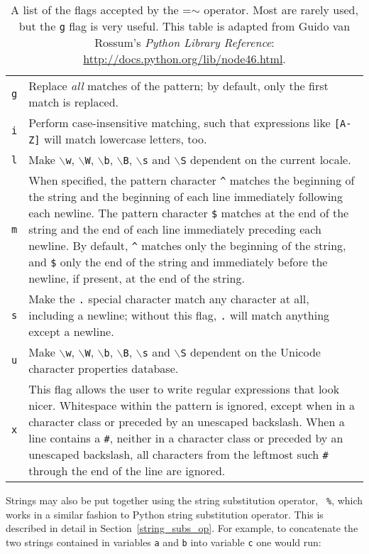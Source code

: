 \begin{table}
\begin{tabular}{p{2cm}p{10.5cm}}
\hline
{\tt g} & Replace {\it all} matches of the pattern; by default, only the first match is replaced. \\
{\tt i} & Perform case-insensitive matching, such that expressions like {\tt [A-Z]} will match lowercase letters, too. \\
{\tt l} & Make {\tt $\backslash$w}, {\tt $\backslash$W}, {\tt $\backslash$b}, {\tt $\backslash$B}, {\tt $\backslash$s} and {\tt $\backslash$S} dependent on the current locale. \\
{\tt m} & When specified, the pattern character {\tt \^{}} matches the beginning of the string and the beginning of each line immediately following each newline. The pattern character {\tt \$} matches at the end of the string and the end of each line immediately preceding each newline. By default, {\tt \^{}} matches only the beginning of the string, and {\tt \$} only the end of the string and immediately before the newline, if present, at the end of the string. \\
{\tt s} & Make the {\tt .} special character match any character at all, including a newline; without this flag, {\tt .} will match anything except a newline. \\
{\tt u} & Make {\tt $\backslash$w}, {\tt $\backslash$W}, {\tt $\backslash$b}, {\tt $\backslash$B}, {\tt $\backslash$s} and {\tt $\backslash$S} dependent on the Unicode character properties database. \\
{\tt x} & This flag allows the user to write regular expressions that look nicer. Whitespace within the pattern is ignored, except when in a character class or preceded by an unescaped backslash. When a line contains a {\tt \#}, neither in a character class or preceded by an unescaped backslash, all characters from the leftmost such {\tt \#} through the end of the line are ignored. \\
\hline
\end{tabular}
\caption{A list of the flags accepted by the =$\sim$ operator. Most are rarely used, but the {\tt g} flag is very useful. This table is adapted from Guido van Rossum's {\it Python Library Reference}: \protect\url{http://docs.python.org/lib/node46.html}.}
\label{re_flags}
\end{table}

Strings may also be put together using the string substitution operator, {\tt
\%}, which works in a similar fashion to
Python string substitution operator. This
is described in detail in Section~\ref{string_subs_op}.  For example, to
concatenate the two strings contained in variables {\tt a} and {\tt b} into
variable {\tt c} one would run:

